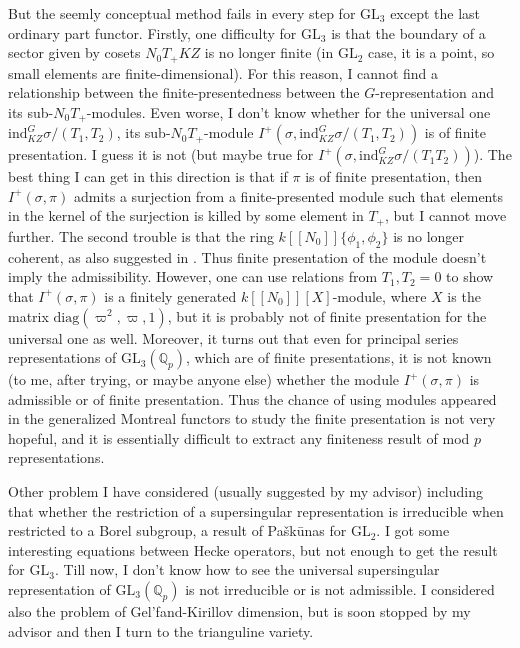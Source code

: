 \documentclass{amsart}
\newcommand{\Q}{\mathbb{Q}}
\newcommand{\GL}{\text{GL}}
\newcommand{\ind}{\text{ind}}
\numberwithin{equation}{section}
\begin{document}
But the seemly conceptual method fails in every step for $\GL_3$ except the last ordinary part functor. Firstly, one difficulty for $\GL_3$ is that the boundary of a sector given by cosets $N_0T_+KZ$ is no longer finite (in $\GL_2$ case, it is a point, so small elements are finite-dimensional). For this reason, I cannot find a relationship between the finite-presentedness between the $G$-representation and its sub-$N_0T_+$-modules. Even worse, I don't know whether for the universal one $\ind_{KZ}^G\sigma/(T_1,T_2)$, its sub-$N_0T_+$-module $I^+(\sigma, \ind_{KZ}^G\sigma/(T_1,T_2))$ is of finite presentation. I guess it is not (but maybe true for $I^+(\sigma, \ind_{KZ}^G\sigma/(T_1T_2))$). The best thing I can get in this direction is that if $\pi$ is of finite presentation, then $I^+(\sigma,\pi)$ admits a surjection from a finite-presented module such that elements in the kernel of the surjection is killed by some element in $T_+$, but I cannot move further. The second trouble is that the ring $k[[N_0]]\{\phi_1,\phi_2\}$ is no longer coherent, as also suggested in \cite{zabradi2018multivariable}. Thus finite presentation of the module doesn't imply the admissibility. However, one can use relations from $T_1,T_2=0$ to show that $I^+(\sigma,\pi)$ is a finitely generated $k[[N_0]][X]$-module, where $X$ is the matrix $\text{diag}(\varpi^2,\varpi,1)$, but it is probably not of finite presentation for the universal one as well. Moreover, it turns out that even for principal series representations of $\GL_3(\Q_p)$, which are of finite presentations, it is not known (to me, after trying, or maybe anyone else) whether the module $I^+(\sigma,\pi)$ is admissible or of finite presentation. Thus the chance of using modules appeared in the generalized Montreal functors to study the finite presentation is not very hopeful, and it is essentially difficult to extract any finiteness result of mod $p$ representations.\par
Other problem I have considered (usually suggested by my advisor) including that whether the restriction of a supersingular representation is irreducible when restricted to a Borel subgroup, a result of Pa{\v{s}}k{\=u}nas for $\GL_2$. I got some interesting equations between Hecke operators, but not enough to get the result for $\GL_3$. Till now, I don't know how to see the universal supersingular representation of $\GL_3(\Q_p)$ is not irreducible or is not admissible. I considered also the problem of Gel'fand-Kirillov dimension, but is soon stopped by my advisor and then I turn to the trianguline variety.
\end{document}

